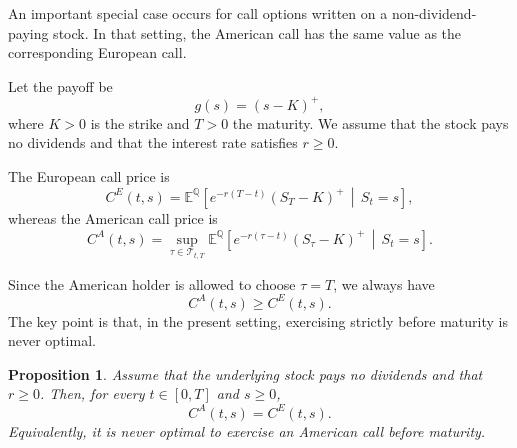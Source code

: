 \documentclass[11pt]{article}
\newcommand{\Qbb}{\mathbb{Q}}
\theoremstyle{definition}
\theoremstyle{plain}
\newtheorem{proposition}{Proposition}
\begin{document}
An important special case occurs for call options written on a
non-dividend-paying stock.
In that setting, the American call has the same value as the
corresponding European call.

\medskip

Let the payoff be
\[
g(s)=(s-K)^+,
\]
where \(K>0\) is the strike and \(T>0\) the maturity.
We assume that the stock pays no dividends and that the interest rate
satisfies \(r\ge 0\).

The European call price is
\[
C^E(t,s)
=
\mathbb E^{\Qbb}\!\left[
e^{-r(T-t)}(S_T-K)^+
\,\middle|\, S_t=s
\right],
\]
whereas the American call price is
\[
C^A(t,s)
=
\sup_{\tau\in\mathcal T_{t,T}}
\mathbb E^{\Qbb}\!\left[
e^{-r(\tau-t)}(S_\tau-K)^+
\,\middle|\, S_t=s
\right].
\]

Since the American holder is allowed to choose \(\tau=T\), we always have
\[
C^A(t,s)\ge C^E(t,s).
\]
The key point is that, in the present setting, exercising strictly
before maturity is never optimal.

\begin{proposition}
Assume that the underlying stock pays no dividends and that \(r\ge 0\).
Then, for every \(t\in[0,T]\) and \(s\ge 0\),
\[
C^A(t,s)=C^E(t,s).
\]
Equivalently, it is never optimal to exercise an American call before
maturity.
\end{proposition}
\end{document}
